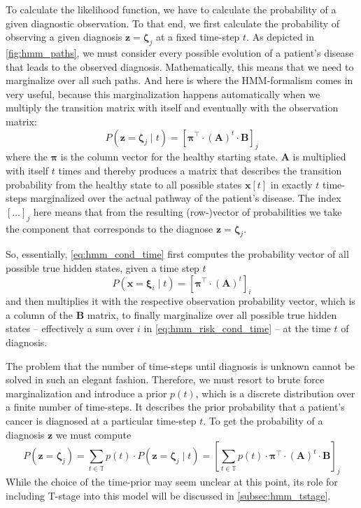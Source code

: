 \documentclass[../ms.tex]{subfiles}
\begin{document}
To calculate the likelihood function, we have to calculate the probability of a given diagnostic observation. To that end, we first calculate the probability of observing a given diagnosis $\mathbf{z} = \boldsymbol{\zeta}_j$ at a fixed time-step $t$. As depicted in \cref{fig:hmm_paths}, we must consider every possible evolution of a patient’s disease that leads to the observed diagnosis. Mathematically, this means that we need to marginalize over all such paths. And here is where the HMM-formalism comes in very useful, because this marginalization happens automatically when we multiply the transition matrix with itself and eventually with the observation matrix:
%
\begin{equation} \label{eq:hmm_cond_time}
    P \left( \mathbf{z} = \boldsymbol{\zeta}_j \mid t \right) = \left[ \boldsymbol{\pi}^\top \cdot (\mathbf{A})^t \cdot \mathbf{B} \right]_j
\end{equation}
%
where the $\boldsymbol{\pi}$ is the column vector for the healthy starting state. $\mathbf{A}$ is multiplied with itself $t$ times and thereby produces a matrix that describes the transition probability from the healthy state to all possible states $\mathbf{x}[t]$ in exactly $t$ time-steps marginalized over the actual pathway of the patient’s disease. The index $[\ldots]_j$ here means that from the resulting (row-)vector of probabilities we take the component that corresponds to the diagnose $\mathbf{z} = \boldsymbol{\zeta}_j$.

So, essentially, \cref{eq:hmm_cond_time} first computes the probability vector of all possible true hidden states, given a time step $t$
%
\begin{equation} \label{eq:hmm_risk_cond_time}
    P \left( \mathbf{x} = \boldsymbol{\xi}_i \mid t \right) = \left[ \boldsymbol{\pi}^\top \cdot (\mathbf{A})^t \right]_i
\end{equation}
%
and then multiplies it with the respective observation probability vector, which is a column of the $\mathbf{B}$ matrix, to finally marginalize over all possible true hidden states -- effectively a sum over $i$ in \cref{eq:hmm_risk_cond_time} -- at the time $t$ of diagnosis.

The problem that the number of time-steps until diagnosis is unknown cannot be solved in such an elegant fashion. Therefore, we must resort to brute force marginalization and introduce a prior $p(t)$, which is a discrete distribution over a finite number of time-steps. It describes the prior probability that a patient's cancer is diagnosed at a particular time-step $t$. To get the probability of a diagnosis $\mathbf{z}$ we must compute
%
\begin{equation} \label{eq:hmm_marginalize}
    P\left( \mathbf{z} = \boldsymbol{\zeta}_j \right) = \sum_{t \in \mathbb{T}}{p(t) \cdot P\left( \mathbf{z} = \boldsymbol{\zeta}_j \mid t \right)} = \left[ \sum_{t \in \mathbb{T}}{p(t) \cdot \boldsymbol{\pi}^\top \cdot (\mathbf{A})^t \cdot \mathbf{B}} \right]_j
\end{equation}
%
While the choice of the time-prior may seem unclear at this point, its role for including T-stage into this model will be discussed in \cref{subsec:hmm_tstage}.
\end{document}
